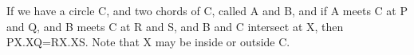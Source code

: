 If we have a circle C, and two chords of C, called A and B, and if
A meets C at P and Q, and B meets C at R and S, and B and C intersect at X,
then PX.XQ=RX.XS. Note that X may be inside or outside C. 